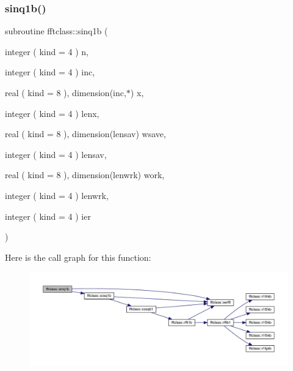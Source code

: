 \subsubsection{\texorpdfstring{sinq1b()}{sinq1b()}}
{\footnotesize\ttfamily subroutine fftclass\+::sinq1b (\begin{DoxyParamCaption}\item[{integer ( kind = 4 )}]{n,  }\item[{integer ( kind = 4 )}]{inc,  }\item[{real ( kind = 8 ), dimension(inc,$\ast$)}]{x,  }\item[{integer ( kind = 4 )}]{lenx,  }\item[{real ( kind = 8 ), dimension(lensav)}]{wsave,  }\item[{integer ( kind = 4 )}]{lensav,  }\item[{real ( kind = 8 ), dimension(lenwrk)}]{work,  }\item[{integer ( kind = 4 )}]{lenwrk,  }\item[{integer ( kind = 4 )}]{ier }\end{DoxyParamCaption})}

Here is the call graph for this function\+:\nopagebreak
\begin{figure}[H]
\begin{center}
\leavevmode
\includegraphics[width=350pt]{namespacefftclass_a6770a2a0c7bdf09af5ed719175fb4ca4_cgraph}
\end{center}
\end{figure}
\mbox{\label{namespacefftclass_a205d9dc43dfb082cdee420a4ae2fb269}} 
